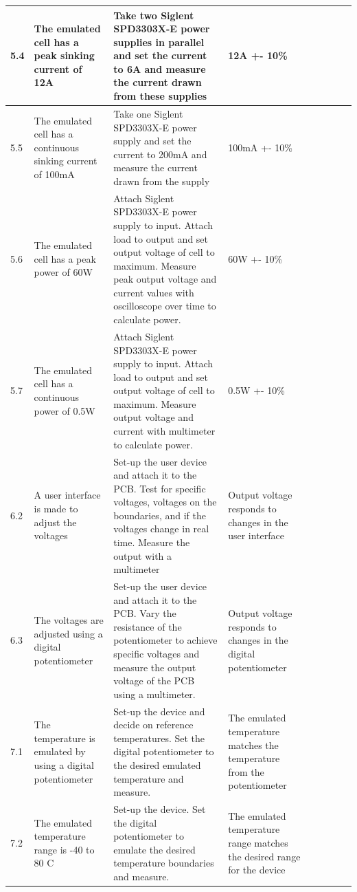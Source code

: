 \begin{table}[!ht]
\begin{tabular}{|l|l|l|l|l|l|l|}
        5.4 & The emulated cell has a peak sinking current of 12A & Take two Siglent SPD3303X-E power supplies in parallel and set the current to 6A and measure the current drawn from these supplies & 12A +- 10\% & ~ & ~ & ~ \\ \hline
        5.5 & The emulated cell has a continuous sinking current of 100mA & Take one Siglent SPD3303X-E power supply and set the current to 200mA and measure the current drawn from the supply & 100mA +- 10\% & ~ & ~ & ~ \\ \hline
        5.6 & The emulated cell has a peak power of 60W & Attach Siglent SPD3303X-E power supply to input. Attach load to output and set output voltage of cell to maximum. Measure peak output voltage and current values with oscilloscope over time to calculate power.  & 60W +- 10\% & ~ & ~ & ~ \\ \hline
        5.7 & The emulated cell has a continuous power of 0.5W & Attach Siglent SPD3303X-E power supply to input. Attach load to output and set output voltage of cell to maximum. Measure output voltage and current with multimeter to calculate power.  & 0.5W +- 10\% & ~ & ~ & ~ \\ \hline
        6.2 & A user interface is made to adjust the voltages & Set-up the user device and attach it to the PCB. Test for specific voltages, voltages on the boundaries, and if the voltages change in real time. Measure the output with a multimeter  & Output voltage responds to changes in the user interface & ~ & ~ & ~ \\ \hline
        6.3 & The voltages are adjusted using a digital potentiometer & Set-up the user device and attach it to the PCB. Vary the resistance of the potentiometer to achieve specific voltages and measure the output voltage of the PCB using a multimeter.   & Output voltage responds to changes in the digital potentiometer  & ~ & ~ & ~ \\ \hline
        7.1 & The temperature is emulated by using a digital potentiometer & Set-up the device and decide on reference temperatures. Set the digital potentiometer to the desired emulated temperature and measure.  & The emulated temperature matches the temperature from the potentiometer & ~ & ~ & ~ \\ \hline
        7.2 & The emulated temperature range is -40 to 80 C & Set-up the device. Set the digital potentiometer to emulate the desired temperature boundaries and measure.  & The emulated temperature range matches the desired range for the device  & ~ & ~ & ~ \\ \hline

\end{tabular}
\end{table}
